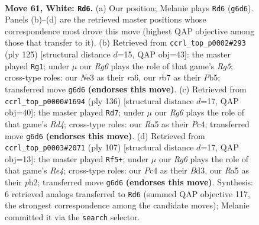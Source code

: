 \documentclass[11pt]{article}
\begin{document}
\clearpage

\begin{figure}[p]\centering
\begin{subfigure}{0.46\textwidth}\centering
\resizebox{\linewidth}{!}{%
\newchessgame
\chessboard[
  setfen={6k1/1r4b1/6R1/R7/2P4K/4N3/8/8 w - - 42 61},
  showmover=false,
  pgfstyle=straightmove, color=movearrow, markmove={g6-d6}
]}
\caption{}
\end{subfigure}\hfill
\begin{subfigure}{0.46\textwidth}\centering
\resizebox{\linewidth}{!}{%
\newchessgame
\chessboard[
  setfen={8/3k4/R7/1p6/4KBrp/P7/8/8 b - - 1 63},
  showmover=false,
  pgfstyle=straightmove, color=movearrow, markmove={g4-g1}
]}
\caption{}
\end{subfigure}
\\[4pt]
\begin{subfigure}{0.46\textwidth}\centering
\resizebox{\linewidth}{!}{%
\newchessgame
\chessboard[
  setfen={8/8/5k2/8/2PRbr2/8/4K3/8 w - - 0 69},
  showmover=false,
  pgfstyle=straightmove, color=movearrow, markmove={d4-d7}
]}
\caption{}
\end{subfigure}\hfill
\begin{subfigure}{0.46\textwidth}\centering
\resizebox{\linewidth}{!}{%
\newchessgame
\chessboard[
  setfen={7R/8/8/4r3/8/1k1bBK2/7P/8 b - - 15 54},
  showmover=false,
  pgfstyle=straightmove, color=movearrow, markmove={e5-f5}
]}
\caption{}
\end{subfigure}
\caption{\textbf{Move 61, White: \texttt{Rd6}.} (a) Our position; Melanie plays \texttt{Rd6} (\texttt{g6d6}). Panels (b)--(d) are the retrieved master positions whose correspondence most drove this move (highest QAP objective among those that transfer to it). (b) Retrieved from \texttt{ccrl\_top\_p0002\#293} (ply 125) [structural distance $d$=15, QAP obj=43]: the master played \texttt{Rg1}; under $\mu$ our \emph{Rg6} plays the role of that game's \emph{Rg5}; cross-type roles: our \emph{N}e3 as their \emph{r}a6, our \emph{r}b7 as their \emph{P}b5; transferred move \texttt{g6d6} \textbf{(endorses this move)}. (c) Retrieved from \texttt{ccrl\_top\_p0000\#1694} (ply 136) [structural distance $d$=17, QAP obj=40]: the master played \texttt{Rd7}; under $\mu$ our \emph{Rg6} plays the role of that game's \emph{Rd4}; cross-type roles: our \emph{R}a5 as their \emph{P}c4; transferred move \texttt{g6d6} \textbf{(endorses this move)}. (d) Retrieved from \texttt{ccrl\_top\_p0003\#2071} (ply 107) [structural distance $d$=17, QAP obj=13]: the master played \texttt{Rf5+}; under $\mu$ our \emph{Rg6} plays the role of that game's \emph{Re4}; cross-type roles: our \emph{P}c4 as their \emph{B}d3, our \emph{R}a5 as their \emph{p}h2; transferred move \texttt{g6d6} \textbf{(endorses this move)}. Synthesis: 6 retrieved analogs transferred to \texttt{Rd6} (summed QAP objective 117, the strongest correspondence among the candidate moves); Melanie committed it via the \texttt{search} selector.}
\label{fig:thought-m120}
\end{figure}
\end{document}
